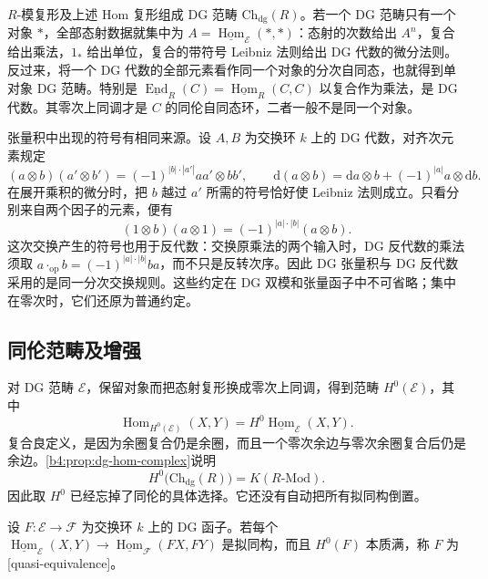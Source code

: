 \(R\)-模复形及上述 Hom 复形组成 DG 范畴 \(\mathrm{Ch}_{\mathrm{dg}}(R)\)。若一个 DG 范畴只有一个对象 \(*\)，全部态射数据就集中为 \(A=\underline{\operatorname{Hom}}_{\mathcal E}(*,*)\)：态射的次数给出 \(A^n\)，复合给出乘法，\(1_*\) 给出单位，复合的带符号 Leibniz 法则给出 DG 代数的微分法则。反过来，将一个 DG 代数的全部元素看作同一个对象的分次自同态，也就得到单对象 DG 范畴。特别是 \(\underline{\operatorname{End}}_R(C)=\underline{\operatorname{Hom}}_R(C,C)\) 以复合作为乘法，是 DG 代数。其零次上同调才是 \(C\) 的同伦自同态环，二者一般不是同一个对象。

\ProseParagraphBreak
张量积中出现的符号有相同来源。设 \(A,B\) 为交换环 \(k\) 上的 DG 代数，对齐次元素规定
\[
	(a\otimes b)(a'\otimes b')=(-1)^{|b|\cdot|a'|}aa'\otimes bb', \qquad \mathrm{d}(a\otimes b)=\mathrm{d}a\otimes b+(-1)^{|a|}a\otimes \mathrm{d}b.
\]
在展开乘积的微分时，把 \(b\) 越过 \(a'\) 所需的符号恰好使 Leibniz 法则成立。只看分别来自两个因子的元素，便有
\[
	(1\otimes b)(a\otimes1)=(-1)^{|a|\cdot|b|}(a\otimes b).
\]
这次交换产生的符号也用于反代数：交换原乘法的两个输入时，DG 反代数的乘法须取 \(a\mathbin{\cdot_{\mathrm{op}}}b=(-1)^{|a|\cdot|b|}ba\)，而不只是反转次序。因此 DG 张量积与 DG 反代数采用的是同一分次交换规则。这些约定在 DG 双模和张量函子中不可省略；集中在零次时，它们还原为普通约定。

\subsection{同伦范畴及增强}
\label{b4:subsec:2001:04}

对 DG 范畴 \(\mathcal E\)，保留对象而把态射复形换成零次上同调，得到范畴 \(H^0(\mathcal E)\)，其中
\[
	\operatorname{Hom}_{H^0(\mathcal E)}(X,Y) =H^0\underline{\operatorname{Hom}}_{\mathcal E}(X,Y).
\]
复合良定义，是因为余圈复合仍是余圈，而且一个零次余边与零次余圈复合后仍是余边。\cref{b4:prop:dg-hom-complex}说明
\[
	H^0\bigl(\mathrm{Ch}_{\mathrm{dg}}(R)\bigr)=K(R\text{-}\mathrm{Mod}).
\]
因此取 \(H^0\) 已经忘掉了同伦的具体选择。它还没有自动把所有拟同构倒置。

\begin{definition}\label{b4:def:dg-quasi-equivalence}
	设 \(F:\mathcal E\to\mathcal F\) 为交换环 \(k\) 上的 DG 函子。若每个 \(\underline{\operatorname{Hom}}_{\mathcal E}(X,Y)\to\underline{\operatorname{Hom}}_{\mathcal F}(FX,FY)\) 是拟同构，而且 \(H^0(F)\) 本质满，称 \(F\) 为[quasi-equivalence]。
\end{definition}

